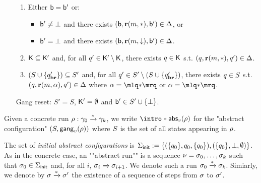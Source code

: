 \begin{definition}
\begin{enumerate}
\begin{enumerate}[label=(\roman*)]
		\item\label{item:external_broadcast_boss}Either $\mathsf{b} = \mathsf{b}'$ or:
		\begin{itemize} 
			\item $\mathsf{b}' \ne \bot$ and there exists $(\mathsf{b}, \textbf{r}(m, {*}), \mathsf{b}') \in \Delta$, or
			\item $\mathsf{b}' = \bot$ and there exists $(\mathsf{b}, \textbf{r}(m, \downarrow), \mathsf{b}') \in \Delta$.
		\end{itemize}

		\item\label{item:external_broadcast_clique}$\mathsf{K} \subseteq \mathsf{K}'$ and, for all $q' \in \mathsf{K}' \setminus \mathsf{K}$, there exists $q \in \mathsf{K}$ s.t. $(q, \textbf{r}(m, {*}), q') \in \Delta$.
		
		\item\label{item:external_broadcast_covset}$(S \cup \{q_{\textbf{br}}'\}) \subseteq S'$ and, for all $q' \in S' \setminus (S \cup \{q_{\textbf{br}}'\})$, there exists $q \in S$ s.t. $(q, \textbf{r}(m, \alpha), q') \in \Delta$ where $\anact = \quotemarks{\dummyact}$ or $\anact = \quotemarks{\dummyact}$.
	\end{enumerate}
	\item[Gang reset:] $S' = S$, $\mathsf{K}' = \emptyset$ and $\mathsf{b}' \in S' \cup \{\bot\}$. 
	\item[] 
\end{enumerate}


Given a concrete run $\rho: \gamma_0 \xrightarrow{*} \gamma_k$, we write \AP  $\intro*\absproj{\aval}{\run}$ for the "abstract configuration" $(S, \mathsf{gang}_{v}(\rho))$ where $S$ is the set of all states appearing in $\rho$. 

The set of \emph{initial abstract configurations} is $\Sigma_{\mathsf{init}} := \{(\{q_0\}, q_0, \{q_0\}), (\{q_0\}, \bot, \emptyset)\}$.  
As in the concrete case, an ""abstract run"" is a sequence $\nu = \sigma_0, \dots, \sigma_k$ such that $\sigma_0 \in \Sigma_{\mathsf{init}}$ and, for all $i$, $\sigma_i \xrightarrow{} \sigma_{i+1}$. We denote such a run $\sigma_0 \xrightarrow{*} \sigma_k$. Simiarly, we denote by $\sigma \xrightarrow{*} \sigma'$ the existence of a sequence of steps from $\sigma$ to $\sigma'$.
\end{definition}


